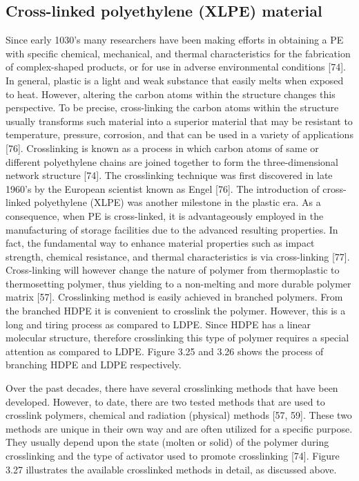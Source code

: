 \documentclass[12pt]{report}
\begin{document}

\subsection{Cross-linked polyethylene (XLPE) material}

Since early 1030’s many researchers have been making efforts in obtaining a PE with specific chemical, mechanical, and thermal characteristics for the fabrication of complex-shaped products, or for use in adverse environmental conditions [74]. In general, plastic is a light and weak substance that easily melts when exposed to heat. However, altering the carbon atoms within the structure changes this perspective. To be precise, cross-linking the carbon atoms within the structure usually transforms such material into a superior material that may be resistant to temperature, pressure, corrosion, and that can be used in a variety of applications [76]. Crosslinking is known as a process in which carbon atoms of same or different polyethylene chains are joined together to form the three-dimensional network structure [74].
The crosslinking technique was first discovered in late 1960’s by the European scientist known as Engel [76]. The introduction of cross-linked polyethylene (XLPE) was another milestone in the plastic era. As a consequence, when PE is cross-linked, it is advantageously employed in the manufacturing of storage facilities due to the advanced resulting properties. In fact, the fundamental way to enhance material properties such as impact strength, chemical resistance, and thermal characteristics is via cross-linking [77]. Cross-linking will however change the nature of polymer from thermoplastic to thermosetting polymer, thus yielding to a non-melting and more durable polymer matrix [57]. Crosslinking method is easily achieved in branched polymers. From the branched HDPE it is convenient to crosslink the polymer. However, this is a long and tiring process as compared to LDPE.
Since HDPE has a linear molecular structure, therefore crosslinking this type of polymer requires a special attention as compared to LDPE. Figure 3.25 and 3.26 shows the process of branching HDPE and LDPE respectively.
 


Over the past decades, there have several crosslinking methods that have been developed. However, to date, there are two tested methods that are used to crosslink polymers, chemical and radiation (physical) methods [57, 59]. These two methods are unique in their own way and are often utilized for a specific purpose. They usually depend upon the state (molten or solid) of the polymer during crosslinking and the type of activator used to promote crosslinking [74]. Figure 3.27 illustrates the available crosslinked methods in detail, as discussed above.
\end{document}
